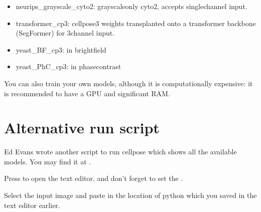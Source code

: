 \documentclass[letterpaper,10pt,english]{jupyterBook}
\begin{document}
\begin{itemize}
\item {} 
\sphinxAtStartPar
neurips\_grayscale\_cyto2: grayscale\sphinxhyphen{}only cyto2, accepts single\sphinxhyphen{}channel input.

\item {} 
\sphinxAtStartPar
transformer\_cp3: cellpose\sphinxhyphen{}3 weights transplanted onto a transformer backbone (SegFormer) for 3\sphinxhyphen{}channel input.

\item {} 
\sphinxAtStartPar
yeast\_BF\_cp3:  in bright\sphinxhyphen{}field

\item {} 
\sphinxAtStartPar
yeast\_PhC\_cp3:  in phase\sphinxhyphen{}contrast

\end{itemize}

\sphinxAtStartPar
You can also train your own models, although it is computationally expensive: it is recommended to have a GPU and significant RAM.


\section{Alternative run script}
\label{\detokenize{cellpose:alternative-run-script}}
\sphinxAtStartPar
Ed Evans wrote another script to run cellpose which shows all the available models. You may find it at .

\sphinxAtStartPar
Press  to open the text editor, and don’t forget to set the .

\sphinxAtStartPar
{}

\sphinxAtStartPar
Select the input image and paste in the location of python which you saved in the text editor earlier.
\end{document}
